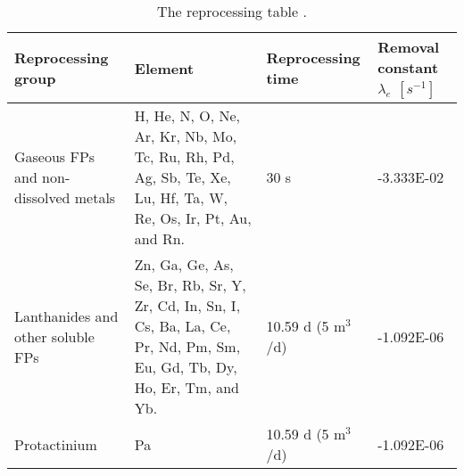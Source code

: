 \begin{table}[ht!]
	\centering
	\caption{The reprocessing table \cite{ashraf2019whole_core}.} 
	\vspace{1ex}
	\begin{tabularx}{\textwidth}{|p{2.3cm}|p{4.5cm}|p{2cm}|p{2cm}|}
			\hline
			\textbf{Reprocessing group}  & \textbf{Element} & \textbf{Reprocessing time} & \textbf{Removal constant} $\lambda_{e}$ $[s^{-1}]$ \\
			\hline
			\raggedright Gaseous \gls{FPs} and non-dissolved metals  &  H, He, N, O, Ne, Ar, Kr, Nb, Mo, Tc, Ru, Rh, Pd, Ag, Sb, Te, Xe, Lu, Hf, Ta, W, Re, Os, Ir, Pt, Au, and Rn.		&	\raggedright 30 s	&  -3.333E-02 \\
			\hline
			\raggedright Lanthanides and other soluble \gls{FPs}     & 
			Zn, Ga, Ge, As, Se, Br, Rb, Sr, Y, Zr, Cd, In, Sn, I, Cs, Ba, La, Ce, Pr, Nd, Pm, Sm, Eu, Gd, Tb, Dy, Ho, Er, Tm, and Yb. & \raggedright 10.59 d (5 m$^3$/d) &  -1.092E-06 \\
			\hline
			Protactinium   & Pa  & \raggedright 10.59 d (5 m$^3$/d)  &  -1.092E-06 \\
			\hline
	\end{tabularx}
	\label{tab:table6}
\end{table}

